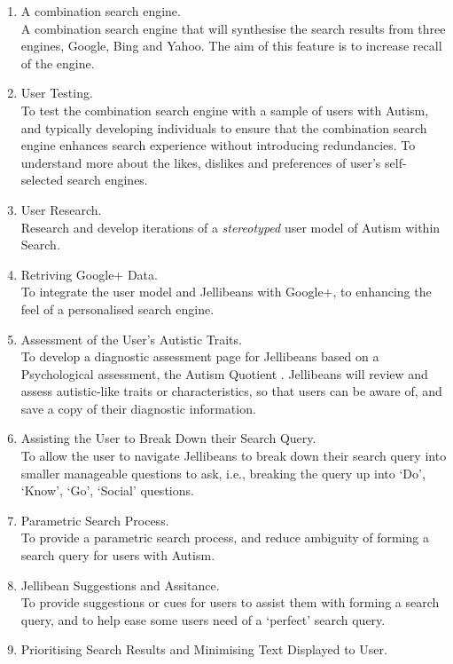 \documentclass[a4paper, 11pt]{article}
\begin{document}
\begin{enumerate}
\item{A combination search engine.} \\
A combination search engine that will synthesise the search results from three engines, Google, Bing and Yahoo. The aim of this feature is to increase recall of the engine. 
\item{User Testing.}\\
To test the combination search engine with a sample of users with Autism, and typically developing individuals to ensure that the combination search engine enhances search experience without introducing redundancies. To understand more about the likes, dislikes and preferences of user's self-selected search engines.
\item{User Research.}\\
Research and develop iterations of a \textit{stereotyped} user model of Autism within Search.
\item{Retriving Google+ Data.}\\
To integrate the user model and Jellibeans with Google+, to enhancing the feel of a personalised search engine.
\item{Assessment of the User's Autistic Traits.}\\
To develop a diagnostic assessment page for Jellibeans based on a Psychological assessment, the Autism Quotient \cite{Baron Cohen et al}. Jellibeans will review and assess autistic-like traits or characteristics, so that users can be aware of, and save a copy of their diagnostic information.
\item{Assisting the User to Break Down their Search Query.}\\
To allow the user to navigate Jellibeans to break down their search query into smaller manageable questions to ask, i.e., breaking the query up into `Do', `Know', `Go', `Social' questions.
\item{Parametric Search Process.} \\
To provide a parametric search process, and reduce ambiguity of forming a search query for users with Autism.
\item{Jellibean Suggestions and Assitance.}\\
To provide suggestions or cues for users to assist them with forming a search query, and to help ease some users need of a `perfect' search query.
\item{Prioritising Search Results and Minimising Text Displayed to User.}\\

\end{enumerate}
\end{document}
